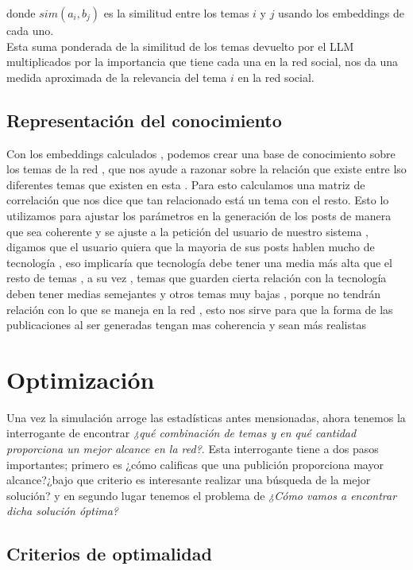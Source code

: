 \documentclass[acmtog]{acmart}
\begin{document}
donde $sim(a_i, b_j)$ es la similitud entre los temas $i$ y $j$ usando los embeddings de cada uno.
\\
Esta suma ponderada de la similitud de los temas devuelto por el LLM multiplicados por la importancia que tiene cada una en la red social, nos da una medida aproximada de la relevancia del tema $i$ en la red social.


\subsection{Representación del conocimiento}
Con los embeddings calculados , podemos crear una base de conocimiento sobre los temas de la red , que nos ayude a razonar sobre la relación que existe entre lso diferentes temas que existen en esta . Para esto calculamos una matriz de correlación que nos dice que tan relacionado está un tema con el resto. Esto lo utilizamos para ajustar los parámetros en la generación de los posts de manera que sea coherente y se ajuste a la petición del usuario de nuestro sistema , digamos que el usuario quiera que la mayoria de sus posts hablen mucho de tecnología , eso implicaría que tecnología debe tener una media más alta que el resto de temas , a su vez , temas que guarden cierta relación con la tecnología deben tener medias semejantes y otros temas muy bajas , porque no tendrán relación con lo que se maneja en la red , esto nos sirve para que la forma de las publicaciones al ser generadas tengan mas coherencia y sean más realistas


\section{Optimización}

Una vez la simulación arroge las estadísticas antes mensionadas, ahora tenemos la interrogante de encontrar \textit{¿qué combinación de temas y en qué cantidad proporciona un mejor alcance en la red?}.
Esta interrogante tiene a dos pasos importantes; primero es ¿cómo calificas que una publición proporciona mayor alcance?¿bajo que criterio es interesante realizar una búsqueda de la mejor solución? y
en segundo lugar tenemos el problema de \textit{¿Cómo vamos a encontrar dicha solución óptima?}

\subsection{Criterios de optimalidad}
\end{document}

